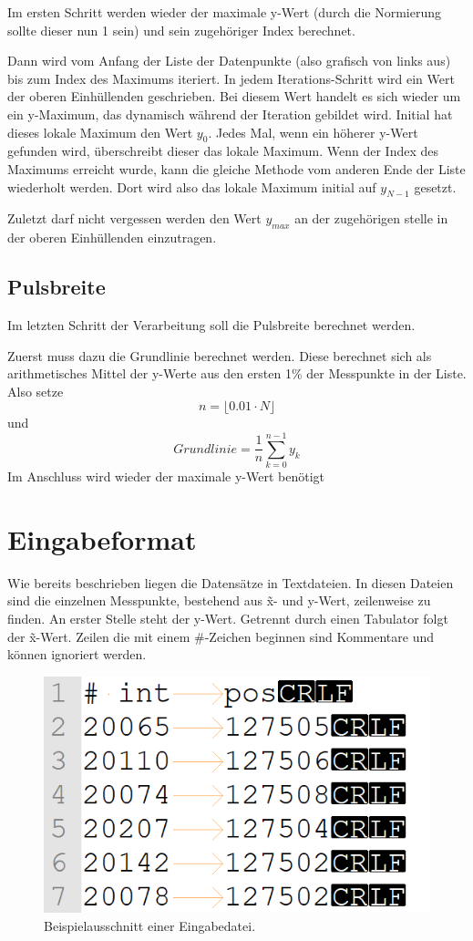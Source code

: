 Im ersten Schritt werden wieder der maximale y-Wert (durch die Normierung sollte dieser nun 1 sein) und sein zugehöriger Index berechnet.

Dann wird vom Anfang der Liste der Datenpunkte (also grafisch von links aus) bis zum Index des Maximums iteriert.
In jedem Iterations-Schritt wird ein Wert der oberen Einhüllenden geschrieben.
Bei diesem Wert handelt es sich wieder um ein y-Maximum, das dynamisch während der Iteration gebildet wird.
Initial hat dieses lokale Maximum den Wert $y_0$.
Jedes Mal, wenn ein höherer y-Wert gefunden wird, überschreibt dieser das lokale Maximum.
Wenn der Index des Maximums erreicht wurde, kann die gleiche Methode vom anderen Ende der Liste wiederholt werden.
Dort wird also das lokale Maximum initial auf $y_{N-1}$ gesetzt.

Zuletzt darf nicht vergessen werden den Wert $y_{max}$ an der zugehörigen stelle in der oberen Einhüllenden einzutragen.

\subsection{Pulsbreite}\label{subsec:pulsbreite}
Im letzten Schritt der Verarbeitung soll die Pulsbreite berechnet werden.

Zuerst muss dazu die Grundlinie berechnet werden.
Diese berechnet sich als arithmetisches Mittel der y-Werte aus den ersten 1\% der Messpunkte in der Liste.
Also setze
\[
    n = \lfloor0.01 \cdot N \rfloor
\]
und
\[
    Grundlinie = \frac{1}{n} \sum_{k = 0}^{n - 1} y_k
\]
Im Anschluss wird wieder der maximale y-Wert benötigt



\section{Eingabeformat}\label{sec:eingabe-format}
Wie bereits beschrieben liegen die Datensätze in Textdateien.
In diesen Dateien sind die einzelnen Messpunkte, bestehend aus \~x- und y-Wert, zeilenweise zu finden.
An erster Stelle steht der y-Wert.
Getrennt durch einen Tabulator folgt der \~x-Wert.
Zeilen die mit einem \#-Zeichen beginnen sind Kommentare und können ignoriert werden.
\begin{figure}[htb]
    \centering
    \includegraphics[width=0.5\linewidth]{images/eingabeDat_bsp}
    \caption{
        Beispielausschnitt einer Eingabedatei.
    }
    \label{fig:eingabe_dat_beispiel}
\end{figure}


